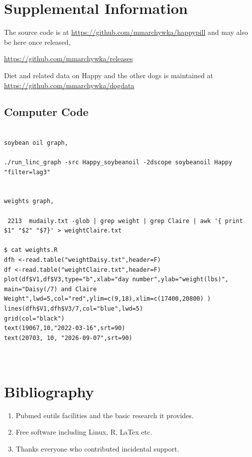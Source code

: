 

\section{Supplemental Information}

The source code is at 
\url{https://github.com/mmarchywka/happypill}
and may also be here once released,

\url{https://github.com/mmarchywka/releases}

Diet and related data on Happy and the other dogs
is maintained at 
\url{https://github.com/mmarchywka/dogdata}

\subsection{Computer Code}


\begin{lstlisting}

soybean oil graph,

./run_linc_graph -src Happy_soybeanoil -2dscope soybeanoil Happy "filter=lag3" 


weights graph, 

 2213  mudaily.txt -glob | grep weight | grep Claire | awk '{ print $1" "$2" "$7}' > weightClaire.txt

$ cat weights.R
dfh <-read.table("weightDaisy.txt",header=F)
df <-read.table("weightClaire.txt",header=F)
plot(df$V1,df$V3,type="b",xlab="day number",ylab="weight(lbs)", main="Daisy(/7) and Claire Weight",lwd=5,col="red",ylim=c(9,18),xlim=c(17400,20800) )
lines(dfh$V1,dfh$V3/7,col="blue",lwd=5)
grid(col="black")
text(19067,10,"2022-03-16",srt=90)
text(20703, 10, "2026-09-07",srt=90)



\end{lstlisting}
\section{Bibliography}






\begin{acknowledgments} 

% 
\begin{enumerate}
\item Pubmed eutils facilities and the basic research it provides. 
\item Free software including Linux, R, LaTex  etc.
\item Thanks everyone who contributed incidental support. 
\end{enumerate}

\end{acknowledgments}

